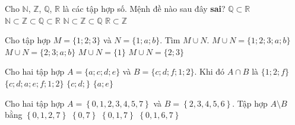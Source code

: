 \begin{ex}%
	Cho $\mathbb{N}$, $\mathbb{Z}$, $\mathbb{Q}$, $\mathbb{R}$ là các tập hợp số. Mệnh đề nào sau đây \textbf{sai}?
	\choice
	{$\mathbb{Q} \subset \mathbb{R}$}
	{$\mathbb{N} \subset \mathbb{Z} \subset \mathbb{Q} \subset \mathbb{R}$}
	{$\mathbb{N} \subset \mathbb{Z} \subset \mathbb{Q}$}
	{\True $\mathbb{R} \subset \mathbb{Z}$}
\end{ex}
\begin{ex}%
	Cho tập hợp $M=\{1;2;3\}$ và $N=\{1;a;b\}$. Tìm $M\cup N$.
	\choice
	{\True $M\cup N=\{1;2;3;a;b\}$}
	{$M\cup N=\{2;3;a;b\}$}
	{$M\cup N=\{1\}$}
	{$M\cup N=\{2;3\}$}
\end{ex}
\begin{ex}%
	Cho hai tập hợp $A=\{a;c;d;e\}$ và $B=\{c;d;f;1;2\}$. Khi đó $A\cap B$ là	
	\choice
	{$\{1;2;f\}$}
	{$\{c;d;a;e;f;1;2\}$}
	{\True $\{c;d;\}$}
	{$\{a;e\}$}
\end{ex}
\begin{ex}%
	Cho hai tập hợp $A= \left\{0, 1, 2,3,4,5,7\right\}$  và $B= \left\{2,3,4,5,6\right\}$. Tập hợp $A \setminus B$ bằng 
	\choice
	{$ \left\{0,1,2,7\right\}$}
	{$\left\{0,7\right\}$}
	{\True  $\left\{0,1,7\right\}$}
	{$\left\{0,1,6,7\right\}$}
\end{ex}

